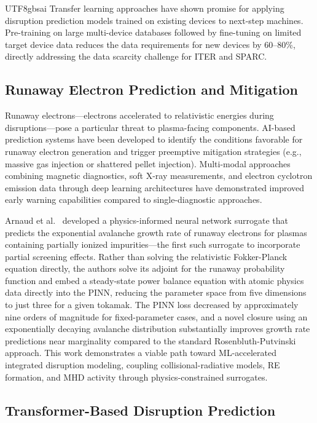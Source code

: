 \documentclass[12pt,a4paper]{article}
\begin{document}
\begin{CJK}{UTF8}{gbsai}
Transfer learning approaches have shown promise for applying disruption prediction models trained on existing devices to next-step machines. Pre-training on large multi-device databases followed by fine-tuning on limited target device data reduces the data requirements for new devices by 60--80\%, directly addressing the data scarcity challenge for ITER and SPARC.

\subsection{Runaway Electron Prediction and Mitigation}

Runaway electrons---electrons accelerated to relativistic energies during disruptions---pose a particular threat to plasma-facing components. AI-based prediction systems have been developed to identify the conditions favorable for runaway electron generation and trigger preemptive mitigation strategies (e.g., massive gas injection or shattered pellet injection). Multi-modal approaches combining magnetic diagnostics, soft X-ray measurements, and electron cyclotron emission data through deep learning architectures have demonstrated improved early warning capabilities compared to single-diagnostic approaches.

Arnaud et al.~\citep{Arnaud2025} developed a physics-informed neural network surrogate that predicts the exponential avalanche growth rate of runaway electrons for plasmas containing partially ionized impurities---the first such surrogate to incorporate partial screening effects. Rather than solving the relativistic Fokker-Planck equation directly, the authors solve its adjoint for the runaway probability function and embed a steady-state power balance equation with atomic physics data directly into the PINN, reducing the parameter space from five dimensions to just three for a given tokamak. The PINN loss decreased by approximately nine orders of magnitude for fixed-parameter cases, and a novel closure using an exponentially decaying avalanche distribution substantially improves growth rate predictions near marginality compared to the standard Rosenbluth-Putvinski approach. This work demonstrates a viable path toward ML-accelerated integrated disruption modeling, coupling collisional-radiative models, RE formation, and MHD activity through physics-constrained surrogates.

\subsection{Transformer-Based Disruption Prediction}


\end{CJK}
\end{document}
